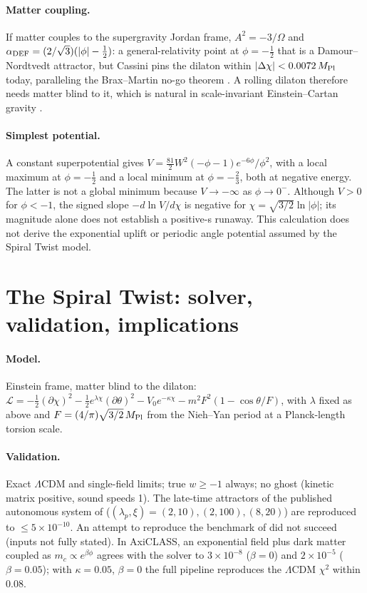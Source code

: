\documentclass[11pt]{article}
\newcommand{\Mp}{M_{\rm Pl}}
\begin{document}
\paragraph{Matter coupling.} If matter couples to the supergravity Jordan frame, $A^2=-3/\Omega$ and
$\alpha_{\rm DEF}=(2/\sqrt3)(|\phi|-\tfrac12)$: a general-relativity point at $\phi=-\tfrac12$ that is a
Damour--Nordtvedt attractor, but Cassini pins the dilaton within $|\Delta\chi|<0.0072\,\Mp$ today, paralleling the
Brax--Martin no-go theorem \cite{brax2007}. A rolling dilaton therefore needs matter blind to it, which is natural in
scale-invariant Einstein--Cartan gravity \cite{karananas2021,piani2022}.

\paragraph{Simplest potential.} A constant superpotential gives $V=\tfrac{81}{2}W^2(-\phi-1)e^{-6\phi}/\phi^2$, with
a local maximum at $\phi=-\tfrac12$ and a local minimum at $\phi=-\tfrac23$, both at negative energy. The latter is
not a global minimum because $V\to-\infty$ as $\phi\to0^{-}$. Although $V>0$ for $\phi<-1$, the signed slope
$-d\ln V/d\chi$ is negative for $\chi=\sqrt{3/2}\ln|\phi|$; its magnitude alone does not establish a positive-s
runaway. This calculation does not derive the exponential uplift or periodic angle potential assumed by the Spiral
Twist model.

\section{The Spiral Twist: solver, validation, implications}
\paragraph{Model.} Einstein frame, matter blind to the dilaton:
$\mathcal L=-\tfrac12(\partial\chi)^2-\tfrac12e^{\lambda\chi}(\partial\theta)^2-V_0e^{-\kappa\chi}-m^2F^2(1-\cos\theta/F)$,
with $\lambda$ fixed as above and $F=(4/\pi)\sqrt{3/2}\,\Mp$ from the Nieh--Yan period at a Planck-length torsion scale.
\paragraph{Validation.} Exact $\Lambda$CDM and single-field limits; true $w\ge-1$ always; no ghost (kinetic matrix
positive, sound speeds 1). The late-time attractors of the published autonomous system of \cite{ramos2026}
($(\lambda_p,\xi)=(2,10),(2,100),(8,20)$) are reproduced to $\le5\times10^{-10}$. An attempt to reproduce the
benchmark of \cite{toomey2025} did not succeed (inputs not fully stated). In AxiCLASS, an exponential field plus dark
matter coupled as $m_c\propto e^{\beta\phi}$ agrees with the solver to $3\times10^{-8}$ ($\beta=0$) and $2\times10^{-5}$
($\beta=0.05$); with $\kappa=0.05$, $\beta=0$ the full pipeline reproduces the $\Lambda$CDM $\chi^2$ within 0.08.
\end{document}

